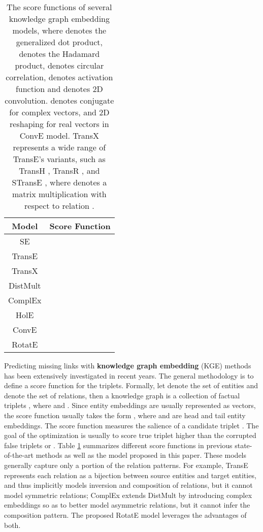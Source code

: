 \documentclass{article} \usepackage{iclr2019_conference,times}
\def\method{RotatE}
\begin{document}
\begin{table}[t]
\centering
\small
\begin{tabular}{|c|c|c|}
\hline
\textbf{Model} &  \multicolumn{2}{c|}{\textbf{Score Function}}\\
\hline
\hline
SE \citep{bordes2011learning} &  &
\\
\hline
TransE \citep{bordes2013translating} &  & \\
\hline
TransX &  & \\
\hline
DistMult \citep{yang2014embedding} &  & \\
\hline
ComplEx \citep{trouillon2016complex} &  & \\
\hline
HolE \citep{nickel2016holographic} &  & \\
\hline
ConvE \citep{dettmers2017convolutional} &  & \\
\hline
\hline
\method{} & \footnotemark & \\
\hline
\end{tabular}
\caption{The score functions  of several knowledge graph embedding models, where  denotes the generalized dot product,  denotes the Hadamard product,  denotes circular correlation,  denotes activation function and  denotes 2D convolution.  denotes conjugate for complex vectors, and 2D reshaping for real vectors in ConvE model. TransX represents a wide range of TransE's variants, such as TransH  \citep{wang2014knowledge}, TransR \citep{lin2015learning}, and STransE \citep{nguyen2016stranse}, where  denotes a matrix multiplication with respect to relation .}
\label{tab:score}
\end{table}


Predicting missing links with \textbf{knowledge graph embedding} (KGE) methods has been extensively investigated in recent years. The general methodology is to define a score function for the triplets. Formally, let  denote the set of entities and  denote the set of relations, then a knowledge graph is a collection of factual triplets , where  and . Since entity embeddings are usually represented as vectors, the score function usually takes the form , where  and  are head and tail entity embeddings. The score function  measures the salience of a candidate triplet . The goal of the optimization is usually to score true triplet  higher than the corrupted false triplets  or . Table \ref{tab:score} summarizes different score functions  in previous state-of-the-art methods as well as the model proposed in this paper. 
These models generally capture only a portion of the relation patterns. For example, TransE represents each relation as a bijection between source entities and target entities, and thus implicitly models inversion and composition of relations, but it cannot model symmetric relations; ComplEx extends DistMult by introducing complex embeddings so as to better model asymmetric relations, but it cannot infer the composition pattern.
The proposed \method{} model leverages the advantages of both.
\end{document}
